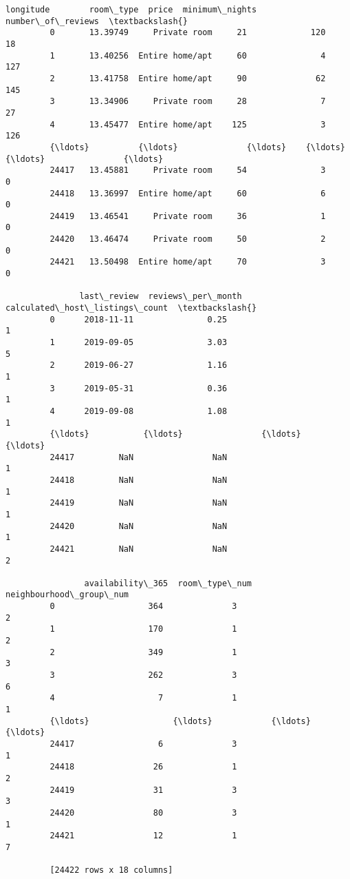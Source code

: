 \documentclass[11pt]{article}
\begin{document}
\begin{Verbatim}[commandchars=\\\{\}]
                longitude        room\_type  price  minimum\_nights  number\_of\_reviews  \textbackslash{}
         0       13.39749     Private room     21             120                 18   
         1       13.40256  Entire home/apt     60               4                127   
         2       13.41758  Entire home/apt     90              62                145   
         3       13.34906     Private room     28               7                 27   
         4       13.45477  Entire home/apt    125               3                126   
         {\ldots}          {\ldots}              {\ldots}    {\ldots}             {\ldots}                {\ldots}   
         24417   13.45881     Private room     54               3                  0   
         24418   13.36997  Entire home/apt     60               6                  0   
         24419   13.46541     Private room     36               1                  0   
         24420   13.46474     Private room     50               2                  0   
         24421   13.50498  Entire home/apt     70               3                  0   
         
               last\_review  reviews\_per\_month  calculated\_host\_listings\_count  \textbackslash{}
         0      2018-11-11               0.25                               1   
         1      2019-09-05               3.03                               5   
         2      2019-06-27               1.16                               1   
         3      2019-05-31               0.36                               1   
         4      2019-09-08               1.08                               1   
         {\ldots}           {\ldots}                {\ldots}                             {\ldots}   
         24417         NaN                NaN                               1   
         24418         NaN                NaN                               1   
         24419         NaN                NaN                               1   
         24420         NaN                NaN                               1   
         24421         NaN                NaN                               2   
         
                availability\_365  room\_type\_num  neighbourhood\_group\_num  
         0                   364              3                        2  
         1                   170              1                        2  
         2                   349              1                        3  
         3                   262              3                        6  
         4                     7              1                        1  
         {\ldots}                 {\ldots}            {\ldots}                      {\ldots}  
         24417                 6              3                        1  
         24418                26              1                        2  
         24419                31              3                        3  
         24420                80              3                        1  
         24421                12              1                        7  
         
         [24422 rows x 18 columns]
\end{Verbatim}
            
\end{document}
